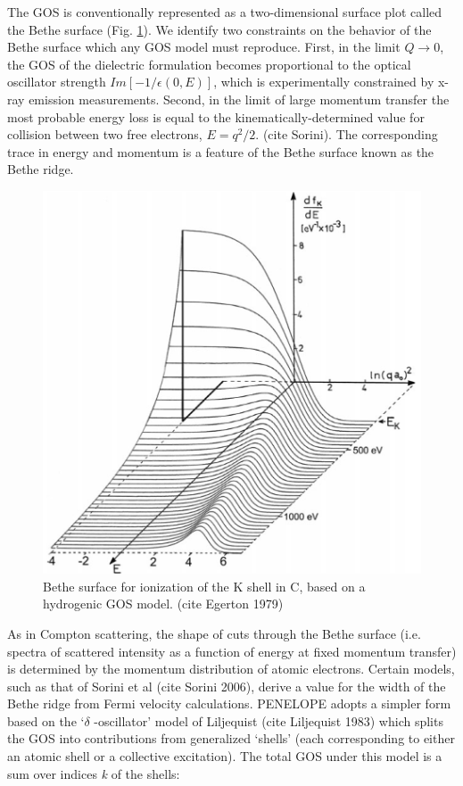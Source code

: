 \documentclass [11pt, proquest, article] {uwthesis}[2016/11/22]
\begin{document}
The GOS is conventionally represented as a two-dimensional surface plot called the Bethe surface (Fig. \ref{fig:bethe}). 
We identify two constraints on the behavior of the Bethe surface which any GOS model must reproduce. First, in the limit $Q\rightarrow 0$, the GOS of the dielectric formulation becomes proportional to  the optical oscillator strength $Im[-1/\epsilon(0, E)]$, which is experimentally constrained by x-ray emission measurements. Second, in the limit of large momentum transfer the most probable energy loss is equal to the kinematically-determined value for collision between two free electrons, $E = q^2/2$. (cite Sorini). The corresponding trace in energy and momentum is a feature of the Bethe surface known as the Bethe ridge.

\begin{figure}[h] 
\caption{Bethe surface for ionization of the K shell in C, based on a hydrogenic GOS model. (cite Egerton 1979)}
\label{fig:bethe}
\centering
\includegraphics[scale=0.5]{../Figures/bethe.png}
\end{figure}

As in Compton scattering, the shape of cuts through the Bethe surface (i.e. spectra of scattered intensity as a function of energy at fixed momentum transfer) is determined by the momentum distribution of atomic electrons. Certain models, such as that of Sorini et al (cite Sorini 2006), derive a value for the width of the Bethe ridge from Fermi velocity calculations. PENELOPE adopts a simpler form based on the `$\delta$ -oscillator' model of Liljequist (cite Liljequist 1983) which splits the GOS into contributions from generalized `shells' (each corresponding to either an atomic shell or a collective excitation). The total GOS under this model is a sum over indices \emph{k} of the shells:
\end{document}
